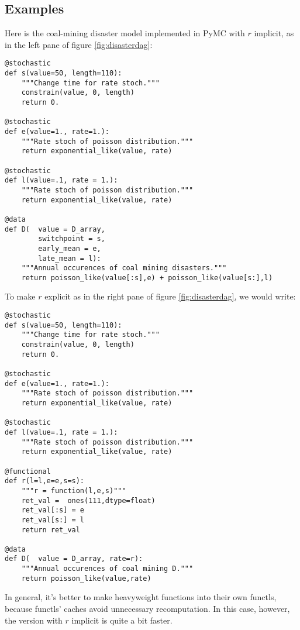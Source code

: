 \subsection{Examples}\label{sub:example}
Here is the coal-mining disaster model implemented in PyMC with $r$ implicit, as in the left pane of figure \ref{fig:disasterdag}:
\begin{verbatim}
@stochastic
def s(value=50, length=110):
    """Change time for rate stoch."""
    constrain(value, 0, length)
    return 0.

@stochastic
def e(value=1., rate=1.):
    """Rate stoch of poisson distribution."""
    return exponential_like(value, rate)

@stochastic
def l(value=.1, rate = 1.):
    """Rate stoch of poisson distribution."""
    return exponential_like(value, rate)

@data
def D(  value = D_array,
        switchpoint = s,
        early_mean = e,
        late_mean = l):
    """Annual occurences of coal mining disasters."""
    return poisson_like(value[:s],e) + poisson_like(value[s:],l)
\end{verbatim}
To make $r$ explicit as in the right pane of figure \ref{fig:disasterdag}, we would write:
\begin{verbatim}
@stochastic
def s(value=50, length=110):
    """Change time for rate stoch."""
    constrain(value, 0, length)
    return 0.

@stochastic
def e(value=1., rate=1.):
    """Rate stoch of poisson distribution."""
    return exponential_like(value, rate)

@stochastic
def l(value=.1, rate = 1.):
    """Rate stoch of poisson distribution."""
    return exponential_like(value, rate)

@functional
def r(l=l,e=e,s=s):
    """r = function(l,e,s)"""
    ret_val =  ones(111,dtype=float)
    ret_val[:s] = e
    ret_val[s:] = l
    return ret_val

@data
def D(  value = D_array, rate=r):
    """Annual occurences of coal mining D."""
    return poisson_like(value,rate)
\end{verbatim}
In general, it's better to make heavyweight functions into their own functls, because functls' caches avoid unnecessary recomputation. In this case, however, the version with $r$ implicit is quite a bit faster.